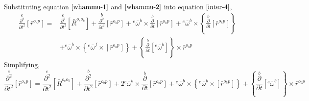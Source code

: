 \documentclass[class=report, 12pt, crop=false]{standalone}
\begin{document}
\begin{center}
Substituting equation $\ref{whammu-1}$ and $\ref{whammu-2}$ into equation $\ref{inter-4}$,
\begin{align*}\overset{e}{\frac{\partial^{2}}{\partial t^{2}}}[\bar{r}^{o_{e}p}]    =&    \overset{e}{\frac{\partial^{2}}{\partial t^{2}}}[\bar{R}^{o_{e}o_{b}}]     +   \overset{b}{\frac{\partial^{2}}{\partial t^{2}}}[\bar{r}^{o_{b}p}] + {}^{e}\bar{\omega}^{b}\times\overset{b}{\frac{\partial}{\partial t}}[\bar{r}^{o_{b}p}]     +   {}^{e}\bar{\omega}^{b}\times\left\{\overset{b}{\frac{\partial}{\partial t}}\left[\bar{r}^{o_{b}p}\right]\right\}   \\&+   {}^{e}\bar{\omega}^{b}\times\left\{{}^{e}\bar{\omega}^{f}\times\left[\bar{r}^{o_{b}p}\right]\right\}    +    \left\{\overset{b}{\frac{\partial}{\partial t}}[{}^{e}\bar{\omega}^{b}]\right\}\times\bar{r}^{o_{b}p}\end{align*}
Simplifying,
\begin{equation}\overset{e}{\frac{\partial^{2}}{\partial t^{2}}}[\bar{r}^{o_{e}p}]    =    \overset{e}{\frac{\partial^{2}}{\partial t^{2}}}[\bar{R}^{o_{e}o_{b}}]     +   \overset{b}{\frac{\partial^{2}}{\partial t^{2}}}[\bar{r}^{o_{b}p}] + 2{}^{e}\bar{\omega}^{b}\times\overset{b}{\frac{\partial}{\partial t}}[\bar{r}^{o_{b}p}]    +   {}^{e}\bar{\omega}^{b}\times\left\{{}^{e}\bar{\omega}^{b}\times\left[\bar{r}^{o_{b}p}\right]\right\}    +    \left\{\overset{b}{\frac{\partial}{\partial t}}[{}^{e}\bar{\omega}^{b}]\right\}\times\bar{r}^{o_{b}p}\label{esidisi1}\end{equation}


\end{center}
\end{document}
